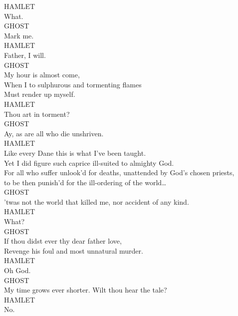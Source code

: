 \noindent{}HAMLET\\
What.\\

\noindent{}GHOST\\
Mark me.\\

\noindent{}HAMLET\\
Father, I will.\\

\noindent{}GHOST\\
My hour is almost come,\\
When I to sulphurous and tormenting flames\\
Must render up myself.\\

\noindent{}HAMLET\\
Thou art in torment?\\

\noindent{}GHOST\\
Ay, as are all who die unshriven.\\

\noindent{}HAMLET\\
Like every Dane this is what I've been taught.\\
Yet I did figure such caprice ill-suited to almighty God.\\
For all who suffer unlook'd for deaths, unattended by God's chosen priests,\\
to be then punish'd for the ill-ordering of the world{\ldots}\\

\noindent{}GHOST\\
'twas not the world that killed me, nor accident of any kind.\\

\noindent{}HAMLET\\
What?\\

\noindent{}GHOST\\
If thou didst ever thy dear father love,\\
Revenge his foul and most unnatural murder.\\

\noindent{}HAMLET\\
Oh God.\\

\noindent{}GHOST\\
My time grows ever shorter. Wilt thou hear the tale?\\

\noindent{}HAMLET\\
No.\\

